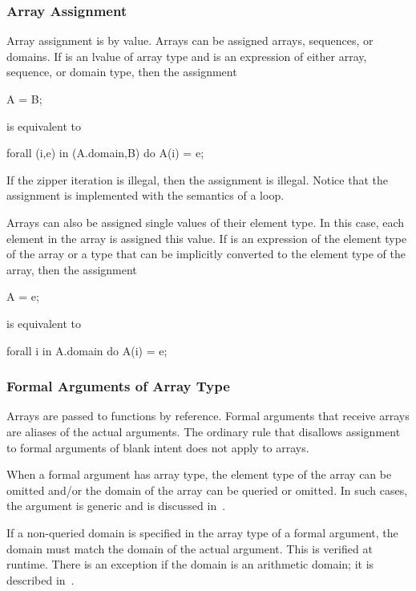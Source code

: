 \subsubsection{Array Assignment}
\label{Array_Assignment}

Array assignment is by value.  Arrays can be assigned arrays,
sequences, or domains.  If  is an lvalue of array type
and  is an expression of either array, sequence, or domain
type, then the assignment
\begin{chapel}
A = B;
\end{chapel}
is equivalent to
\begin{chapel}
forall (i,e) in (A.domain,B) do
  A(i) = e;
\end{chapel}
If the zipper iteration is illegal, then the assignment is illegal.
Notice that the assignment is implemented with the semantics of
a  loop.

Arrays can also be assigned single values of their element type.  In
this case, each element in the array is assigned this value.
If  is an expression of the element type of the array or a
type that can be implicitly converted to the element type of the
array, then the assignment
\begin{chapel}
A = e;
\end{chapel}
is equivalent to
\begin{chapel}
forall i in A.domain do
  A(i) = e;
\end{chapel}

\subsubsection{Formal Arguments of Array Type}
\label{Formal_Arguments_of_Array_Type}

Arrays are passed to functions by reference.  Formal arguments that
receive arrays are aliases of the actual arguments.  The ordinary rule
that disallows assignment to formal arguments of blank intent does not
apply to arrays.

When a formal argument has array type, the element type of the array
can be omitted and/or the domain of the array can be queried or
omitted.  In such cases, the argument is generic and is discussed
in~.

If a non-queried domain is specified in the array type of a formal
argument, the domain must match the domain of the actual argument.
This is verified at runtime.  There is an exception if the domain is
an arithmetic domain; it is described
in~.

